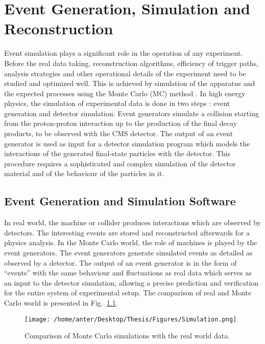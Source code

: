 \chapter{Event Generation, Simulation and Reconstruction}
\label{chap:Reconstruction}
Event simulation plays a significant role in the operation of any experiment. Before the real data taking, reconstruction algorithms, efficiency of trigger paths, analysis strategies and other operational details of the experiment need to be studied and optimized well. This is achieved by simulation of the apparatus and the expected processes using the Monte Carlo (MC) method \cite{Monte}. In high energy physics, the simulation of experimental data is done in two steps : event generation and detector simulation. Event generators simulate a collision starting from the proton-proton interaction up to the production of the final decay products, to be observed with the CMS detector. The output of an event generator is used as input for a detector simulation program which models the interactions of the generated final-state particles with the detector. This procedure requires a sophisticated and complex simulation of the detector material and of the behaviour of the particles in it.

\section{Event Generation and Simulation Software}
In real world, the machine or collider produces interactions which are observed by detectors. The interesting events are stored and reconstructed afterwards for a physics analysis. In the Monte Carlo world, the role of machines is played by the event generators. The event generators generate simulated events as detailed as observed by a detector. The output of an event generator is in the form of ``events'' with the same behaviour and fluctuations as real data which serves as an input to the detector simulation, allowing a precise prediction and verification for the entire system of experimental setup. The comparison of real and Monte Carlo world is presented in Fig.~\ref{fig:sim}. %

\begin{figure}[h!]
\begin{center}
\vspace*{2mm} 
\texttt{[image: /home/anter/Desktop/Thesis/Figures/Simulation.png]}\\
\vspace*{4mm} 
\caption{Comparison of Monte Carlo simulations with the real world data.}
\label{fig:sim}
\end{center}
\end{figure}

